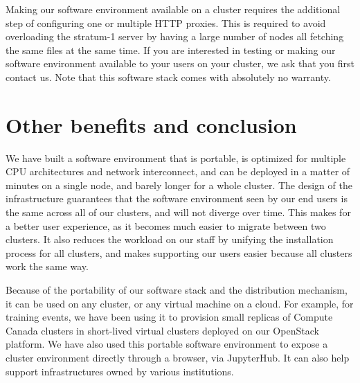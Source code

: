 \documentclass[sigconf]{acmart}
\begin{document}
Making our software environment available on a cluster requires the additional step of configuring one or multiple HTTP proxies. This is required to avoid overloading the stratum-1 server by having a large number of nodes all fetching the same files at the same time. If you are interested in testing or making our software environment available to your users on your cluster, we ask that you first contact us. Note that this software stack comes with absolutely no warranty. 

\section{Other benefits and conclusion}
\label{sec:Conclusion}
We have built a software environment that is portable, is optimized for multiple CPU architectures and network interconnect, and can be deployed in a matter of minutes on a single node, and barely longer for a whole cluster. The design of the infrastructure guarantees that the software environment seen by our end users is the same across all of our clusters, and will not diverge over time. This makes for a better user experience, as it becomes much easier to migrate between two clusters. It also reduces the workload on our staff by unifying the installation process for all clusters, and makes supporting our users easier because all clusters work the same way.

Because of the portability of our software stack and the distribution mechanism, it can be used on any cluster, or any virtual machine on a cloud. For example, for training events, we have been using it to provision small replicas of Compute Canada clusters in short-lived virtual clusters deployed on our OpenStack platform. We have also used this portable software environment to expose a cluster environment directly through a browser, via JupyterHub. It can also help support infrastructures owned by various institutions.
\end{document}
